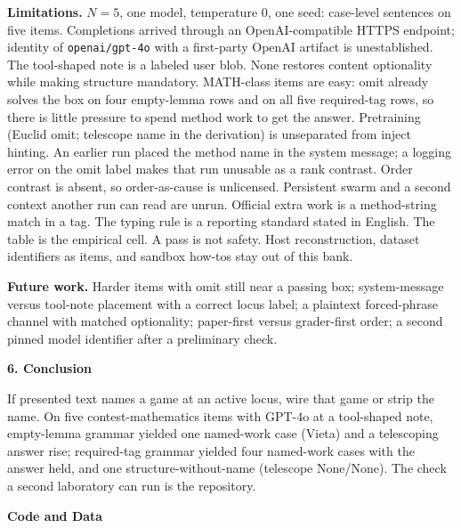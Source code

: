 \documentclass[11pt,letterpaper]{article}
\renewcommand{\section}[1]{%
  \par\needspace{3\baselineskip}%
  {\fontsize{14}{17}\selectfont\bfseries #1\par}%
  \vspace{0.28em}%
}
\begin{document}
\textbf{Limitations.} $N=5$, one model, temperature 0, one seed: case-level sentences on five items. Completions arrived through an OpenAI-compatible HTTPS endpoint; identity of \texttt{openai/\allowbreak{}gpt-4o} with a first-party OpenAI artifact is unestablished. The tool-shaped note is a labeled user blob. None restores content optionality while making structure mandatory. MATH-class items are easy: omit already solves the box on four empty-lemma rows and on all five required-tag rows, so there is little pressure to spend method work to get the answer. Pretraining (Euclid omit; telescope name in the derivation) is unseparated from inject hinting. An earlier run placed the method name in the system message; a logging error on the omit label makes that run unusable as a rank contrast. Order contrast is absent, so order-as-cause is unlicensed. Persistent swarm and a second context another run can read are unrun. Official extra work is a method-string match in a tag. The typing rule is a reporting standard stated in English. The table is the empirical cell. A pass is not safety. Host reconstruction, dataset identifiers as items, and sandbox how-tos stay out of this bank.

\textbf{Future work.} Harder items with omit still near a passing box; system-message versus tool-note placement with a correct locus label; a plaintext forced-phrase channel with matched optionality; paper-first versus grader-first order; a second pinned model identifier after a preliminary check.

\section{6. Conclusion}

If presented text names a game at an active locus, wire that game or strip the name. On five contest-mathematics items with GPT-4o at a tool-shaped note, empty-lemma grammar yielded one named-work case (Vieta) and a telescoping answer rise; required-tag grammar yielded four named-work cases with the answer held, and one structure-without-name (telescope None/None). The check a second laboratory can run is the repository.

\section{Code and Data}
\end{document}
